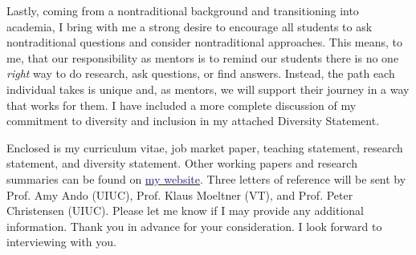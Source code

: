 \documentclass[12pt,sigleft,stdletternofrom]{newlfm} %
\begin{document}
\begin{newlfm}
Lastly, coming from a nontraditional background and transitioning into academia, I bring with me a strong desire to encourage all students to ask nontraditional questions and consider nontraditional approaches. This means, to me, that our responsibility as mentors is to remind our students there is no one \textit{right} way to do research, ask questions, or find answers. Instead, the path each individual takes is unique and, as mentors, we will support their journey in a way that works for them. I have included a more complete discussion of my commitment to diversity and inclusion in my attached Diversity Statement.

Enclosed is my curriculum vitae, job market paper, teaching statement, research statement, and diversity statement. Other working papers and research summaries can be found on \href{https://www.bryanparthum.com}{\textcolor{MidnightBlue}{my website}}. Three letters of reference will be sent by Prof. Amy Ando (UIUC), Prof. Klaus Moeltner (VT), and Prof. Peter Christensen (UIUC). Please let me know if I may provide any additional information. Thank you in advance for your consideration. I look forward to interviewing with you.



\end{newlfm}
\end{document}
